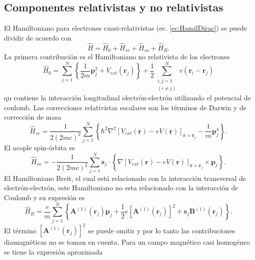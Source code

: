 \documentclass[12pt,a4paper, oneside]{book}
\begin{document}
    \subsection{Componentes relativistas y no relativistas} \label{subsec:rel_norel}
    El Hamiltoniano para electrones cuasi-relativistas (ec. \ref{ec:HamilDirac}) se puede dividir de acuerdo con
    \begin{equation}
    \hat{H} = \hat{H}_0 + \hat{H}_{sr} + \hat{H}_{so} + \hat{H}_{B}. \label{ec:divHamDirac}
    \end{equation} 
    La primera contribuci\'on es el Hamiltoniano  no relativista de los electrones
    \begin{equation}
    \hat{H}_0 = \sum_{j=1}^{N} \left\{\frac{1}{2m} \pmb{p}_j ^2 + V_{ext} (\pmb{r}_j) \right\} + \frac{1}{2} \sum_{\substack{i,j = 1 \\ (i \not = j)}}^{N} v(\pmb{r}_i -\pmb{r}_j) \label{ec:HamnoRel}
    \end{equation} 
    qu contiene la interacci\'on longitudinal  electr\'on-electr\'on utilizando el potencial de coulomb. Las correcciones relativistas escalares son los t\'erminos de Darwin y de correcci\'on de masa
    \begin{equation}
    \hat{H}_{sr} = \frac{1}{2 (2 m c)^2} \sum_{j=1}^{N} \left\{\hbar^2 \nabla^2 [V_{ext} (\pmb{r})-e V(\pmb{r})]_{\pmb{r}= \pmb{r}_j} - \frac{1}{m} \pmb{p}_j ^4 \right\}. \label{ec:HamSR}
    \end{equation}
    El acople spin-\'orbita es 
    \begin{equation}
    \hat{H}_{so} = -\frac{1}{2 (2 m c)^2} \sum_{j=1}^{N} \pmb{s}_j \cdot \left\{\nabla [V_{ext} (\pmb{r})-e V(\pmb{r})]_{\pmb{r}=\pmb{r}_j} \times \pmb{p}_j \right\}. \label{ec:HamSo}
    \end{equation}
    El Hamiltoniano Breit, el cual est\'a relacionado con la interacci\'on transversal de electr\'on-electr\'on, este Hamiltoniano no esta relacionado con la interacci\'on de Coulomb y su expresi\'on es
    \begin{equation}
    \hat{H}_B= \frac{e}{m} \sum_{j=1}^N \left\{\pmb{A}^{(1)} (\pmb{r}_j) \pmb{p}_j + \frac{1}{2} e \left[\pmb{A}^{(1)} (\pmb{r}_j)\right]^2 + \pmb{s}_j \pmb{B}^{(1)} (\pmb{r}_j) \right\}. \label{ec:HamBreit}
    \end{equation}
    El t\'ermino $\left[\pmb{A}^{(1)} (\pmb{r}_j)\right]^2 $ se puede omitir y por lo tanto las contribuciones diamagn\'eticas no se toman en cuenta.
    \newline
    Para un campo magn\'etico casi homog\'eneo se tiene la expresi\'on aproximada
\end{document}
